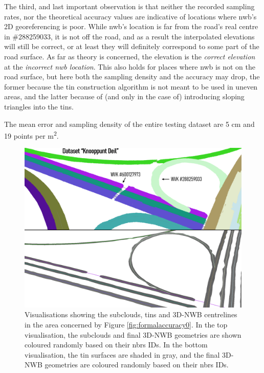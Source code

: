 The third, and last important observation is that neither the recorded sampling rates, nor the theoretical accuracy values are indicative of locations where \ac{nwb}'s 2D georeferencing is poor. While \ac{nwb}'s location is far from the road's real centre in \#288259033, it is not off the road, and as a result the interpolated elevations will still be correct, or at least they will definitely correspond to some part of the road surface. As far as theory is concerned, the elevation is the \textit{correct elevation} at the \textit{incorrect \ac{nwb} location}. This also holds for places where \ac{nwb} is not on the road surface, but here both the sampling density and the accuracy may drop, the former because the \ac{tin} construction algorithm is not meant to be used in uneven areas, and the latter because of (and only in the case of) introducing sloping triangles into the \ac{tin}s.

The mean error and sampling density of the entire testing dataset are 5 cm and 19 points per m\textsuperscript{2}.

\begin{figure}[h]
    \centering
    \includegraphics[width=0.9\linewidth]{final_report/figs/formalaccuracy1.png}
    \caption[Renders showing the subclouds, TINs and 3D-NWB centrelines relevant to Figure \ref{fig:formalaccuracy0}]{Visualisations showing the subclouds, \ac{tin}s and 3D-NWB centrelines in the area concerned by Figure \ref{fig:formalaccuracy0}. In the top visualisation, the subclouds and final 3D-NWB geometries are shown coloured randomly based on their \ac{nbrs} IDs. In the bottom visualisation, the \ac{tin} surfaces are shaded in gray, and the final 3D-NWB geometries are coloured randomly based on their \ac{nbrs} IDs.}
    \label{fig:formalaccuracy1}
\end{figure}

